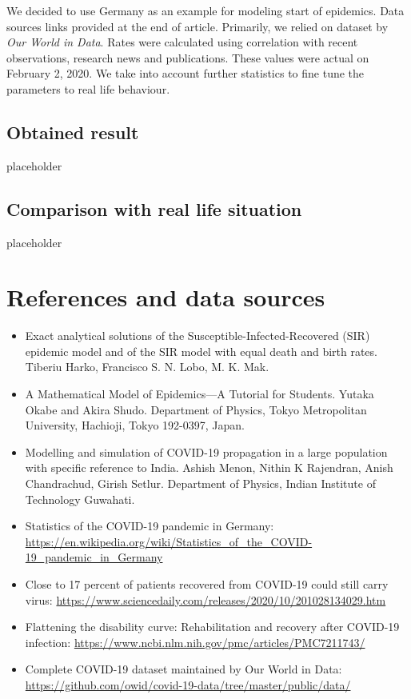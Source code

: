 \documentclass[12pt, a4paper]{article}
\begin{document}
	We decided to use Germany as an example for modeling start of epidemics. Data sources links provided at the end of article. Primarily, we relied on dataset by \textit{Our World in Data}. Rates were calculated using correlation with recent observations, research news and publications. These values were actual on February 2, 2020. We take into account further statistics to fine tune the parameters to real life behaviour.

	\subsection{Obtained result}
	placeholder

	\subsection{Comparison with real life situation}
	placeholder

	\section{References and data sources}
	\begin{itemize}
		\item Exact analytical solutions of the Susceptible-Infected-Recovered (SIR) epidemic
		model and of the SIR model with equal death and birth rates. Tiberiu Harko, Francisco S. N. Lobo, M. K. Mak.

		\item A Mathematical Model of Epidemics—A Tutorial
		for Students. Yutaka Okabe and Akira Shudo. Department of Physics, Tokyo Metropolitan University, Hachioji, Tokyo 192-0397, Japan.

		\item Modelling and simulation of COVID-19 propagation in a large population with specific reference to India.
		Ashish Menon, Nithin K Rajendran, Anish Chandrachud, Girish Setlur. Department of Physics, Indian Institute of Technology Guwahati.

		\item Statistics of the COVID-19 pandemic in Germany: \url{https://en.wikipedia.org/wiki/Statistics_of_the_COVID-19_pandemic_in_Germany}
	
		\item Close to 17 percent of patients recovered from COVID-19 could still carry virus: \url{https://www.sciencedaily.com/releases/2020/10/201028134029.htm}
		
		\item Flattening the disability curve: Rehabilitation and recovery after COVID-19 infection: \url{https://www.ncbi.nlm.nih.gov/pmc/articles/PMC7211743/}
		
		\item Complete COVID-19 dataset maintained by Our World in Data: \url{https://github.com/owid/covid-19-data/tree/master/public/data/}
		
		
	\end{itemize}

	
\end{document}
